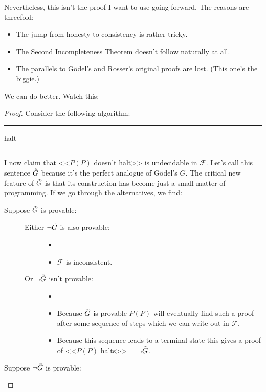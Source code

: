 \documentclass{article}
\theoremstyle{customstyle}
\newcommand{\F}{\ensuremath{\mathcal{F}}}
\newcommand{\iGoedel}{\ensuremath{\accentset{\scalebox{0.35}{$\infty$}}{G}}}
\newenvironment{algo}{\begin{samepage}\medskip\hrule\begin{algorithmic}}{\end{algorithmic}\hrule\medskip\end{samepage}}
\begin{document}
Nevertheless, this isn't the proof I want to use going forward. The reasons are threefold:
\begin{itemize}[topsep=0.5em, label=$\bullet$]
\item The jump from honesty to consistency is rather tricky.
\item The Second Incompleteness Theorem doesn't follow naturally at all.
\item The parallels to Gödel's and Rosser's original proofs are lost. (This one's the biggie.)
\end{itemize}
We can do better. Watch this:
\begin{proof}
Consider the following algorithm:
\begin{algo}
      \State halt
    \EndIf
  \EndFor
\EndFunction
\end{algo}
I now claim that <<$P(P)$ doesn't halt>> is undecidable in $\F$. Let's call this sentence $\iGoedel$ because it's the perfect analogue of Gödel's $G$. The critical new feature of $\iGoedel$ is that its construction has become just a small matter of programming. If we go through the alternatives, we find:
\begin{description}
\item[Suppose $\iGoedel$ is provable:]
\begin{description}
\item[]
\item[Either $\neg \iGoedel$ is also provable:]
\begin{itemize}
\item[]
\item $\F$ is inconsistent. \lightning
\end{itemize}
\item[Or $\neg \iGoedel$ isn't provable:]
\begin{itemize}
\item[]
\item Because $\iGoedel$ is provable $P(P)$ will eventually find such a proof after some sequence of steps which we can write out in $\F$.
\item Because this sequence leads to a terminal state this gives a proof of <<$P(P)$ halts>> = $\neg \iGoedel$. \lightning
\end{itemize}
\end{description}
\item[Suppose $\neg \iGoedel$ is provable:]
\begin{description}

\end{description}
\end{description}
\end{proof}
\end{document}
